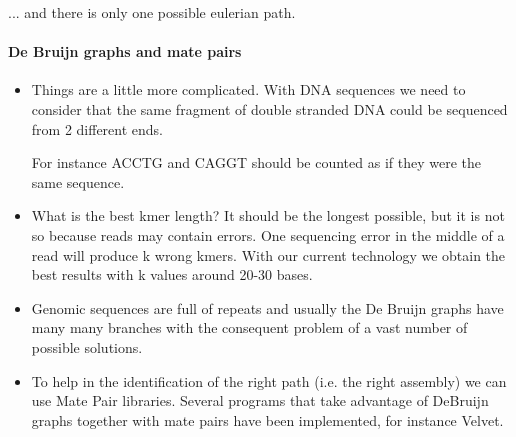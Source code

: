 ... and there is only one possible eulerian path.

\paragraph*{De Bruijn graphs and mate pairs}

\begin{itemize}
	\item Things are a little more complicated. With DNA sequences we need to
consider that the same fragment of double stranded DNA could be sequenced
from 2 different ends.

For instance ACCTG and CAGGT should be counted as if they were the same
sequence. 
	\item What is the best kmer length? It should be the longest possible, but
it is not so because reads may contain errors.
One sequencing error in the middle of a read will produce k wrong kmers.
With our current technology we obtain the best results with k values around
20-30 bases.
	\item Genomic sequences are full of repeats and usually the De Bruijn
graphs have many many branches with the consequent problem of a vast number
of possible solutions.
	\item To help in the identification of the right path (i.e. the right
assembly) we can use Mate Pair libraries.
Several programs that take advantage of DeBruijn graphs together 
with mate pairs have been implemented, for instance Velvet. 
\end{itemize}
